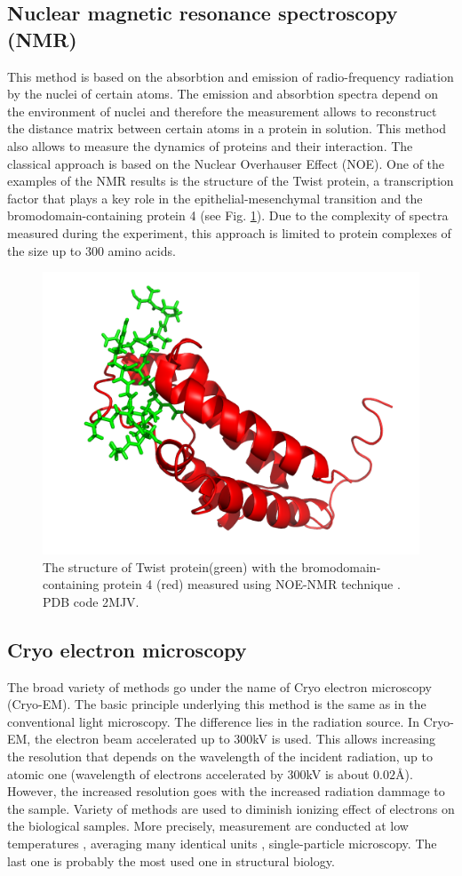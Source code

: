 \subsection{Nuclear magnetic resonance spectroscopy (NMR)}
This method is based on the absorbtion and emission of radio-frequency radiation by the nuclei of certain atoms. The emission and absorbtion spectra depend on the 
environment of nuclei and therefore the measurement allows to reconstruct the distance matrix between certain atoms in a protein in solution. This method also
allows to measure the dynamics of proteins and their interaction. The classical approach is based on the Nuclear Overhauser Effect (NOE). One of the examples of the NMR results is
the structure of the Twist protein, a transcription factor that plays a key role in the epithelial-mesenchymal transition and the bromodomain-containing protein 4 \cite{shi2014disrupting} 
(see Fig. \ref{Fig:TwistBRD4}). Due to the complexity of spectra measured during the experiment, this approach is limited to protein complexes of the size up to 300 amino acids.

\begin{figure}[H]
    \begin{centering}
      \includegraphics[width=0.5\linewidth]{Intro/Fig/TwistBRD4.png}  
      \caption[The structure of Twist protein with the Brd4 protein]{The structure of Twist protein(green) with the bromodomain-containing protein 4 (red) measured using NOE-NMR technique \cite{shi2014disrupting}.
      PDB code 2MJV.}
      \label{Fig:TwistBRD4}
    \end{centering}
\end{figure}

\subsection{Cryo electron microscopy}
The broad variety of methods go under the name of Cryo electron microscopy (Cryo-EM). The basic principle underlying this method is the same as in the conventional
light microscopy. The difference lies in the radiation source. In Cryo-EM, the electron beam accelerated up to 300kV is used. This allows increasing the resolution that 
depends on the wavelength of the incident radiation, up to atomic one (wavelength of electrons accelerated by 300kV is about $0.02$\AA). However, the increased resolution
goes with the increased radiation dammage to the sample. Variety of methods are used to diminish ionizing effect of electrons on the biological samples. More precisely, 
measurement are conducted at low temperatures \cite{dubochet1988cryo}, averaging many identical units \cite{taylor1974electron}, single-particle microscopy.
The last one is probably the most used one in structural biology. 

